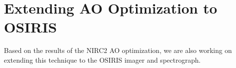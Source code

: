 \section{Extending AO Optimization to OSIRIS}
\label{sec:osiris}

Based on the results of the NIRC2 AO optimization, we are also working on extending this technique to the OSIRIS imager and spectrograph. 
  